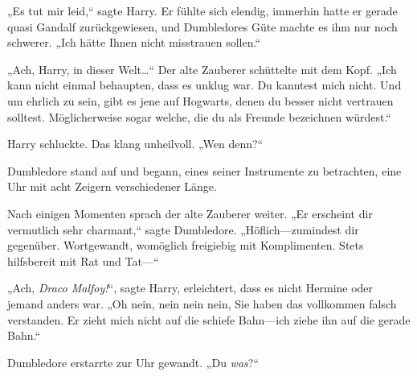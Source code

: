 „Es tut mir leid,“ sagte Harry. Er fühlte sich elendig, immerhin hatte er gerade quasi Gandalf zurückgewiesen, und Dumbledores Güte machte es ihm nur noch schwerer. „Ich hätte Ihnen nicht misstrauen sollen.“

„Ach, Harry, in dieser Welt…“ Der alte Zauberer schüttelte mit dem Kopf. „Ich kann nicht einmal behaupten, dass es unklug war. Du kanntest mich nicht. Und um ehrlich zu sein, gibt es jene auf Hogwarts, denen du besser nicht vertrauen solltest. Möglicherweise sogar welche, die du als Freunde bezeichnen würdest.“

Harry schluckte. Das klang unheilvoll. „Wen denn?“

Dumbledore stand auf und begann, eines seiner Instrumente zu betrachten, eine Uhr mit acht Zeigern verschiedener Länge.

Nach einigen Momenten sprach der alte Zauberer weiter. „Er erscheint dir vermutlich sehr charmant,“ sagte Dumbledore. „Höflich—zumindest dir gegenüber. Wortgewandt, womöglich freigiebig mit Komplimenten. Stets hilfsbereit mit Rat und Tat—“

„Ach, \emph{Draco Malfoy!}“, sagte Harry, erleichtert, dass es nicht Hermine oder jemand anders war. „Oh nein, nein nein nein, Sie haben das vollkommen falsch verstanden. Er zieht mich nicht auf die schiefe Bahn—ich ziehe ihn auf die gerade Bahn.“

Dumbledore erstarrte zur Uhr gewandt. „Du \emph{was}?“

